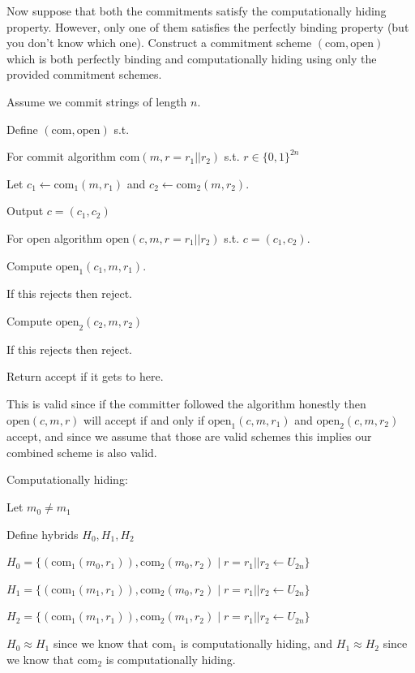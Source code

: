 \documentclass[12pt, letterpaper]{article}
\newcommand{\bit}{{\{0,1\}}}
\newcommand{\from}{\leftarrow}
\newcommand{\com}{\mathrm{com}}
\begin{document}
\begin{subproblem}{}
    Now suppose that both the commitments satisfy the computationally hiding property.
However, only one of them satisfies the perfectly binding property (but you don't know
which one). Construct a commitment scheme $(\mathrm{com}, \mathrm{open})$ which is both perfectly
binding and computationally hiding using only the provided commitment schemes.
\end{subproblem}
\begin{problemproof}
    Assume we commit strings of length $n$.

    Define $(\mathrm{com}, \mathrm{open})$ s.t.

    For commit algorithm $\mathrm{com}(m,r=r_1||r_2)$ s.t. $r \in \bit^{2n}$

    Let $c_1 \leftarrow \mathrm{com}_1(m,r_1)$ and $c_2 \leftarrow \mathrm{com}_2(m,r_2)$.

    Output $c=(c_1,c_2)$
    
    \phantom{text}

    For open algorithm $\mathrm{open}(c,m,r=r_1||r_2)$ s.t. $c=(c_1,c_2)$.

    Compute $\mathrm{open}_1(c_1,m,r_1)$.

    If this rejects then reject.

    Compute $\mathrm{open}_2(c_2,m,r_2)$
    
    If this rejects then reject.

    Return accept if it gets to here.

    This is valid since if the committer followed the algorithm honestly then $\mathrm{open}(c,m,r)$ will accept if and only if $\mathrm{open}_1(c,m,r_1)$ and $\mathrm{open}_2(c,m,r_2)$ accept, and since we assume that those are valid schemes this implies our combined scheme is also valid.

    Computationally hiding:
    
    Let $m_0 \neq m_1$

    Define hybrids $H_0,H_1,H_2$

    $H_0 = \{(\com_1(m_0,r_1)), \com_2(m_0,r_2) \mid r=r_1||r_2 \from U_{2n}\}$

    $H_1 = \{(\com_1(m_1,r_1)), \com_2(m_0,r_2) \mid r=r_1||r_2 \from U_{2n}\}$

    $H_2 = \{(\com_1(m_1,r_1)), \com_2(m_1,r_2) \mid r=r_1||r_2 \from U_{2n}\}$

    $H_0 \approx H_1$ since we know that $\com_1$ is computationally hiding, and $H_1 \approx H_2$ since we know that $\com_2$ is computationally hiding.


\end{problemproof}
\end{document}
